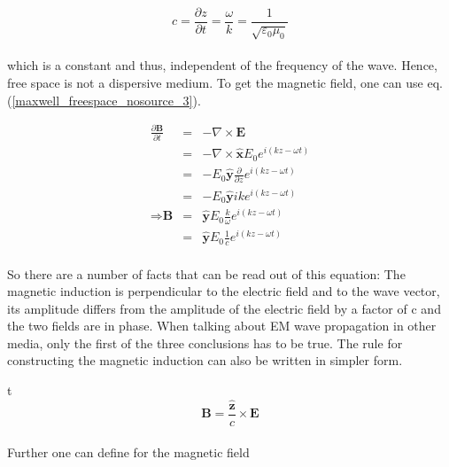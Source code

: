 \documentclass[a4paper,10pt]{thesis}
\begin{document}
\begin{equation}\label{lichtgeschwindigkeit}
    c= \frac{\partial z}{\partial t} = \frac{\omega}{k} =\frac{1}{\sqrt{\varepsilon_0 \mu_0 }}
\end{equation}

\paragraph*{}
which is a constant and thus, independent of the frequency of the wave. Hence, free space is not a dispersive medium. To get the magnetic field, one can use eq. (\ref{maxwell_freespace_nosource_3}).

\begin{eqnarray}
\frac{\partial \mathbf{B}}{\partial t} &=& -\nabla \times \mathbf{E}\\
&=& - \nabla \times \mathbf{\hat{x}}E_0 e^{i(kz-\omega t)} \nonumber \\
&=& - E_0 \mathbf{\hat{y}} \frac{\partial}{\partial z} e^{i(kz-\omega t)} \nonumber \\
&=& - E_0 \mathbf{\hat{y}} ik e^{i(kz-\omega t)} \nonumber \\
\Rightarrow \textbf{B} &=& \mathbf{\hat{y}} E_0 \frac{k}{\omega} e^{i(kz-\omega t)} \label{plane_wave_B} \\
&=&\mathbf{\hat{y}} E_0 \frac{1}{c} e^{i(kz-\omega t)}\nonumber
\end{eqnarray}

\paragraph*{}
So there are a number of facts that can be read out of this equation: The magnetic induction is perpendicular to the electric field and to the wave vector, its amplitude differs from the amplitude of the electric field by a factor of c and the two fields are in phase. When talking about EM wave propagation in other media, only the first of the three conclusions has to be true. The rule for constructing the magnetic induction can also be written in simpler form.

t\begin{equation}\label{plane_wave_B_simpli}
\textbf{B}=\frac{\mathbf{\hat{z}}}{c}\times \mathbf{E}
\end{equation}

\paragraph*{}
Further one can define for the magnetic field
\end{document}
